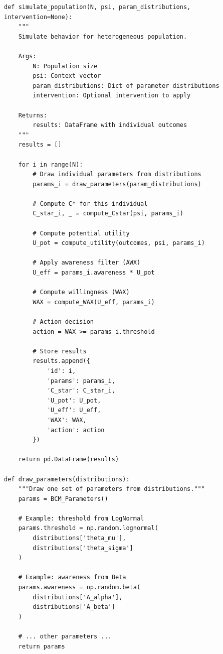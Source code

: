 \begin{tcolorbox}[colback=gray!5!white, colframe=gray!75!black,
    title=Implementation AZ-S3: Population Behavior Simulation]
\begin{verbatim}
def simulate_population(N, psi, param_distributions, intervention=None):
    """
    Simulate behavior for heterogeneous population.

    Args:
        N: Population size
        psi: Context vector
        param_distributions: Dict of parameter distributions
        intervention: Optional intervention to apply

    Returns:
        results: DataFrame with individual outcomes
    """
    results = []

    for i in range(N):
        # Draw individual parameters from distributions
        params_i = draw_parameters(param_distributions)

        # Compute C* for this individual
        C_star_i, _ = compute_Cstar(psi, params_i)

        # Compute potential utility
        U_pot = compute_utility(outcomes, psi, params_i)

        # Apply awareness filter (AWX)
        U_eff = params_i.awareness * U_pot

        # Compute willingness (WAX)
        WAX = compute_WAX(U_eff, params_i)

        # Action decision
        action = WAX >= params_i.threshold

        # Store results
        results.append({
            'id': i,
            'params': params_i,
            'C_star': C_star_i,
            'U_pot': U_pot,
            'U_eff': U_eff,
            'WAX': WAX,
            'action': action
        })

    return pd.DataFrame(results)

def draw_parameters(distributions):
    """Draw one set of parameters from distributions."""
    params = BCM_Parameters()

    # Example: threshold from LogNormal
    params.threshold = np.random.lognormal(
        distributions['theta_mu'],
        distributions['theta_sigma']
    )

    # Example: awareness from Beta
    params.awareness = np.random.beta(
        distributions['A_alpha'],
        distributions['A_beta']
    )

    # ... other parameters ...
    return params
\end{verbatim}
\end{tcolorbox}

